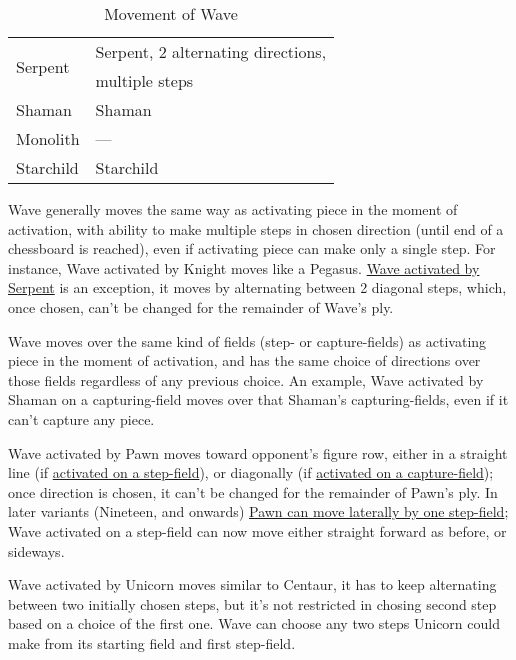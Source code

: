 \begin{table}[!h]
\begin{tabular}{ ll }
\multirow{2}{*}{Serpent}    & Serpent, 2 alternating directions,        \\
                            & multiple steps                            \\\cmidrule{1-2}
Shaman                      & Shaman                                    \\
Monolith                    & ---                                       \\
Starchild                   & Starchild                                 \\
\bottomrule
\end{tabular}
\caption{Movement of Wave}
\label{tbl:Appendix/Movement of Wave}
\end{table}

Wave generally moves the same way as activating piece in the moment of activation,
with ability to make multiple steps in chosen direction (until end of a chessboard
is reached), even if activating piece can make only a single step. For instance,
Wave activated by Knight moves like a Pegasus.
\hyperref[fig:scn_tr_15_serpent_activating_wave]{Wave activated by Serpent} is an
exception, it moves by alternating between 2 diagonal steps, which, once chosen,
can't be changed for the remainder of Wave's ply.

Wave moves over the same kind of fields (step- or capture-fields) as activating
piece in the moment of activation, and has the same choice of directions over those
fields regardless of any previous choice. An example, Wave activated by Shaman on a
capturing-field moves over that Shaman's capturing-fields, even if it can't capture
any piece.

Wave activated by Pawn moves toward opponent's figure row, either in a straight line
(if \hyperref[fig:scn_mv_16_wave_activation_by_step_pawn]{activated on a step-field}),
or diagonally (if
\hyperref[fig:scn_mv_18_wave_activation_by_capture_pawn]{activated on a capture-field});
once direction is chosen, it can't be changed for the remainder of Pawn's ply.
In later variants (Nineteen, and onwards)
\hyperref[fig:scn_n_15_sideways_pawn_init]{Pawn can move laterally by one step-field};
Wave activated on a step-field can now move either straight forward as before, or
sideways.

Wave activated by Unicorn moves similar to Centaur, it has to keep alternating
between two initially chosen steps, but it's not restricted in chosing second step
based on a choice of the first one. Wave can choose any two steps Unicorn could
make from its starting field and first step-field.

